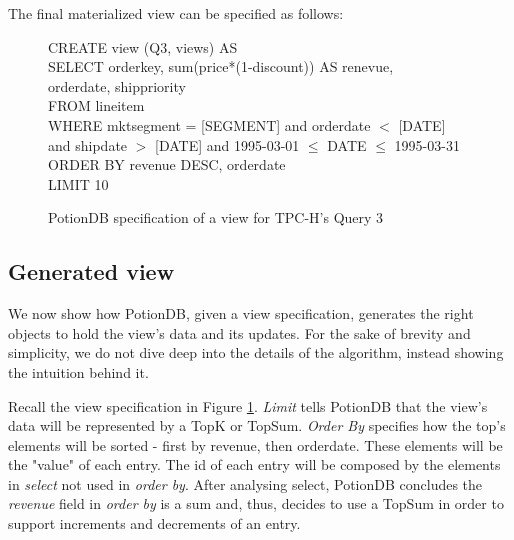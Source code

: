 \documentclass{vldb}
\begin{document}
The final materialized view can be specified as follows:

\begin{figure}[h]
	CREATE view (Q3, views) AS \\
	SELECT orderkey, sum(price*(1-discount)) AS renevue, \\
	\hphantom{SELECT }orderdate, shippriority \\
	FROM lineitem \\
	WHERE mktsegment = [SEGMENT] and orderdate $<$ [DATE] and shipdate $>$ [DATE] and 1995-03-01 $\leq$ DATE $\leq$ 1995-03-31\\
	ORDER BY revenue DESC, orderdate \\
	LIMIT 10 \\
\caption{PotionDB specification of a view for TPC-H's Query 3}
\label{fig:q3_view}
\end{figure}

\subsection{Generated view}
\label{subsec:generated_view}

We now show how PotionDB, given a view specification, generates the right objects to hold the view's data and its updates.
For the sake of brevity and simplicity, we do not dive deep into the details of the algorithm, instead showing the intuition behind it.

Recall the view specification in Figure \ref{fig:q3_view}.
\emph{Limit} tells PotionDB that the view's data will be represented by a TopK or TopSum.
\emph{Order By} specifies how the top's elements will be sorted - first by revenue, then orderdate.
These elements will be the "value" of each entry.
The id of each entry will be composed by the elements in \emph{select} not used in \emph{order by}. %
After analysing select, PotionDB concludes the \emph{revenue} field in \emph{order by} is a sum and, thus, decides to use a TopSum in order to support increments and decrements of an entry.
\end{document}
